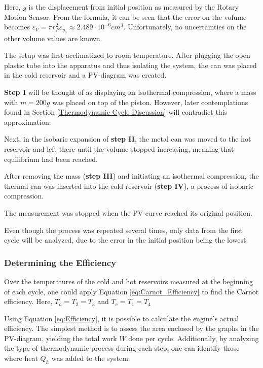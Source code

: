 Here, $\mathit{y}$ is the displacement from initial position as measured by the Rotary Motion Sensor. From the formula, it can be seen that the error on the volume becomes $\mathit{\varepsilon_V = \pi r_P^2 \varepsilon_{y_0} \approx 2.489 \cdot 10^{-6} cm^3}$. Unfortunately, no uncertainties on the other volume values are known.

The setup was first acclimatized to room temperature. After plugging the open plastic tube into the apparatus and thus isolating the system, the can was placed in the cold reservoir and a PV-diagram was created. 

\textbf{Step I} will be thought of as displaying an isothermal compression, where a mass with $\mathit{m = 200g}$ was placed on top of the piston. However, later contemplations found in Section \ref{Thermodynamic Cycle Discussion} will contradict this approximation.

Next, in the isobaric expansion of \textbf{step II}, the metal can was moved to the hot reservoir and left there until the volume stopped increasing, meaning that equilibrium had been reached. 

After removing the mass (\textbf{step III}) and initiating an isothermal compression, the thermal can was inserted into the cold reservoir (\textbf{step IV}), a process of isobaric compression. 

The measurement was stopped when the PV-curve reached its original position.

Even though the process was repeated several times, only data from the first cycle will be analyzed, due to the error in the initial position being the lowest.

\subsubsection{Determining the Efficiency}
\label{Determining the Efficiency}

Over the temperatures of the cold and hot reservoirs measured at the beginning of each cycle, one could apply Equation \ref{eq:Carnot_Efficiency} to find the Carnot efficiency. Here, $\mathit{T_h = T_2 = T_3}$ and $\mathit{T_c = T_1 = T_4}$

Using Equation \ref{eq:Efficiency}, it is possible to calculate the engine's actual efficiency. The simplest method is to assess the area enclosed by the graphs in the PV-diagram, yielding the total work $\mathit{W}$ done per cycle. Additionally, by analyzing the type of thermodynamic process during each step, one can identify those where heat $\mathit{Q_h}$ was added to the system. 

